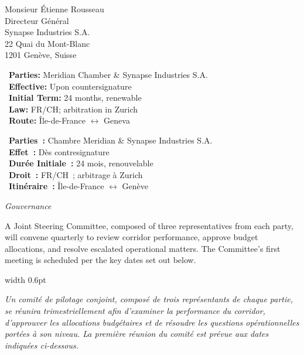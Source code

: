 \documentclass[paper=a4,fontsize=11pt,parskip=half,DIV=11,headsepline,footsepline,addrfield=true,backaddress=false,locfield=narrow,foldmarks=off,enlargefirstpage=on]{scrlttr2}
\newcommand{\bilingual}[2]{%
\noindent\begin{minipage}[t]{0.475\textwidth}\raggedright\small #1\end{minipage}\hspace{0.012\textwidth}%
{\color{gold}\vrule width 0.6pt}\hspace{0.012\textwidth}%
\begin{minipage}[t]{0.475\textwidth}\raggedright\small\itshape #2\end{minipage}\par\smallskip
}
\newcommand{\sectiontitle}[2]{%
\vspace{2pt}\noindent{\color{navy}\bfseries\large #1}\hfill{\color{gold}\itshape\small #2}\par
\noindent{\color{gold}\rule{\dimexpr\linewidth-11pt\relax}{0.7pt}}\par\smallskip
}
\begin{document}
\begin{letter}{Monsieur \'Etienne Rousseau\\Directeur G\'en\'eral\\Synapse Industries S.A.\\22 Quai du Mont-Blanc\\1201 Gen\`eve, Suisse}
\noindent
\begin{minipage}[t]{0.485\textwidth}
\begin{tcolorbox}[colback=pale,colframe=gold,arc=1pt,boxrule=0.6pt,title={At a Glance},coltitle=navy,colbacktitle=white,fonttitle=\bfseries,left=6pt,right=6pt,top=4pt,bottom=4pt]
\footnotesize
\faUsers\ \textbf{Parties:} Meridian Chamber \& Synapse Industries S.A.\\
\faCalendar\ \textbf{Effective:} Upon countersignature\\
\faClock\ \textbf{Initial Term:} 24 months, renewable\\
\faGavel\ \textbf{Law:} FR/CH; arbitration in Zurich\\
\faBuilding\ \textbf{Route:} \^Ile-de-France \(\leftrightarrow\) Geneva
\end{tcolorbox}
\end{minipage}%
\hfill
\begin{minipage}[t]{0.485\textwidth}
\begin{tcolorbox}[colback=pale,colframe=gold,arc=1pt,boxrule=0.6pt,title={En Bref},coltitle=navy,colbacktitle=white,fonttitle=\bfseries,left=6pt,right=6pt,top=4pt,bottom=4pt]
\footnotesize
\faUsers\ \textbf{Parties~:} Chambre Meridian \& Synapse Industries S.A.\\
\faCalendar\ \textbf{Effet~:} D\`es contresignature\\
\faClock\ \textbf{Dur\'ee Initiale~:} 24 mois, renouvelable\\
\faGavel\ \textbf{Droit~:} FR/CH~; arbitrage \`a Zurich\\
\faBuilding\ \textbf{Itin\'eraire~:} \^Ile-de-France \(\leftrightarrow\) Gen\`eve
\end{tcolorbox}
\end{minipage}
\par\medskip

\sectiontitle{Governance}{Gouvernance}

\bilingual{%
A Joint Steering Committee, composed of three representatives from each party, will convene quarterly to review corridor performance, approve budget allocations, and resolve escalated operational matters. The Committee's first meeting is scheduled per the key dates set out below.
}{%
Un comit\'e de pilotage conjoint, compos\'e de trois repr\'esentants de chaque partie, se r\'eunira trimestriellement afin d'examiner la performance du corridor, d'approuver les allocations budg\'etaires et de r\'esoudre les questions op\'erationnelles port\'ees \`a son niveau. La premi\`ere r\'eunion du comit\'e est pr\'evue aux dates indiqu\'ees ci-dessous.
}


\end{letter}
\end{document}
